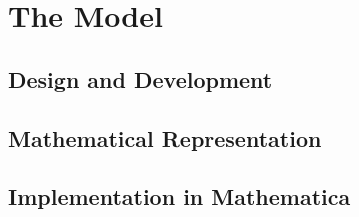 \documentclass[main.tex]{subfiles}
\begin{document}
  \section{The Model}
    \subsection{Design and Development}
      \lipsum[4]
    \subsection{Mathematical Representation}
      \lipsum[5]
    \subsection{Implementation in Mathematica}
      \lipsum[6]
\end{document}
